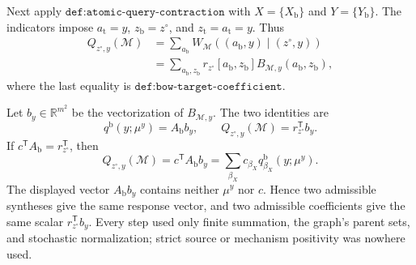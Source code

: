 Next apply \(\texttt{def:atomic-query-contraction}\) with \(X=\{X_{\mathrm b}\}\) and \(Y=\{Y_{\mathrm b}\}\).  The indicators impose \(a_{\mathrm t}=y\), \(z_{\mathrm b}=z^{\circ}\), and \(z_{\mathrm t}=a_{\mathrm t}=y\).  Thus
\[
\begin{aligned}
Q_{z^{\circ},y}(\mathcal M)
&=\sum_{a_{\mathrm b}}W_{\mathcal M}((a_{\mathrm b},y)\mid(z^{\circ},y))\\
&=\sum_{a_{\mathrm b},z_{\mathrm b}}
 r_{z^{\circ}}[a_{\mathrm b},z_{\mathrm b}]
 B_{\mathcal M,y}(a_{\mathrm b},z_{\mathrm b}),
\end{aligned}
\]
where the last equality is \(\texttt{def:bow-target-coefficient}\).

Let \(b_y\in\mathbb R^{m^2}\) be the vectorization of \(B_{\mathcal M,y}\).  The two identities are
\[
q^{\mathrm b}(y;\mu^y)=A_{\mathrm b}b_y,
\qquad
Q_{z^{\circ},y}(\mathcal M)=r_{z^{\circ}}^{\mathsf T}b_y.
\]
If \(c^{\mathsf T}A_{\mathrm b}=r_{z^{\circ}}^{\mathsf T}\), then
\[
Q_{z^{\circ},y}(\mathcal M)
=c^{\mathsf T}A_{\mathrm b}b_y
=\sum_{\beta_X}c_{\beta_X}q^{\mathrm b}_{\beta_X}(y;\mu^y).
\]
The displayed vector \(A_{\mathrm b}b_y\) contains neither \(\mu^y\) nor \(c\).  Hence two admissible syntheses give the same response vector, and two admissible coefficients give the same scalar \(r_{z^{\circ}}^{\mathsf T}b_y\).  Every step used only finite summation, the graph's parent sets, and stochastic normalization; strict source or mechanism positivity was nowhere used.